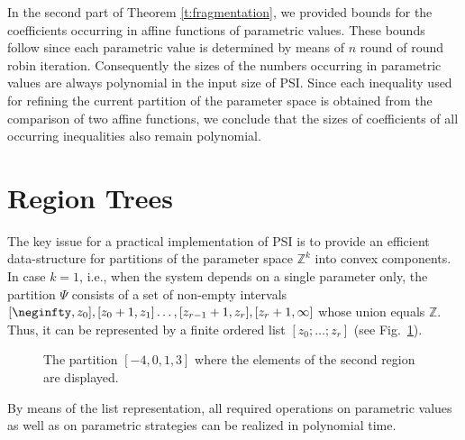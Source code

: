 \documentclass[a4paper]{easychair}
\newcommand{\ZZ}{\mathbb{Z}}
\begin{document}
\noindent
In the second part of Theorem \ref{t:fragmentation},
we provided bounds for the coefficients occurring in affine functions of parametric
values. These bounds follow since each parametric value is determined by means of $n$ round of
round robin iteration. Consequently the sizes of the numbers occurring in parametric values 
are always polynomial in the input size of PSI. Since each inequality used for refining the current
partition of the parameter space is obtained from the comparison of two affine functions, 
we conclude that the sizes of coefficients of all occurring inequalities also remain
polynomial.




\section{Region Trees}\label{s:region}

The key issue for a practical implementation of PSI 
is to provide an efficient data-structure for partitions of the parameter space $\ZZ^k$ into convex components.
In case $k=1$, i.e., when the system depends on a single parameter only,
the partition $\Psi$ consists of a set of non-empty intervals
$[\neginfty,z_0],[z_0+1,z_1]\ldots, [z_{r-1}+1,z_r],[z_r+1,\infty]$ 
 whose union equals $\ZZ$.
Thus, it can be represented by a finite ordered list $[z_0;\ldots; z_r]$ 
(see Fig.\ \ref{f:list}).
\begin{figure}
\centering
{}

\caption{\label{f:list}The partition $[-4,0,1,3]$ where the elements of the second region are displayed.}
\end{figure}
By means of the list representation, all required operations on parametric values as well as on 
parametric strategies can be realized in polynomial time.
\end{document}
